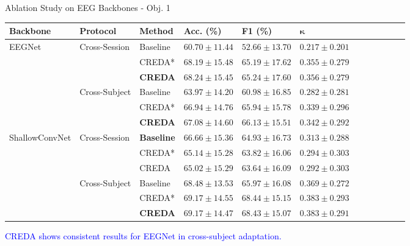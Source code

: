 \documentclass[aspectratio=169]{beamer}
\begin{document}
\begin{frame}{Ablation Study on EEG Backbones - Obj. 1}
\begin{table}
\footnotesize
\centering
\begin{tabularx}{\linewidth}{p{2.4cm}p{1.9cm}p{1.8cm}p{2.4cm}p{2.4cm}p{2.4cm}lllccc}
\toprule
\textbf{Backbone} & \textbf{Protocol} & \textbf{Method} & \textbf{Acc. (\%)} & \textbf{F1 (\%)} & \(\boldsymbol{\kappa}\) \\
\midrule
\multirow{6}{*}{EEGNet}
& \multirow{3}{*}{Cross-Session}
  & Baseline & \(60.70 \pm 11.44\) & \(52.66 \pm 13.70\) & \(0.217 \pm 0.201\) \\
& & CREDA*   & \(68.19 \pm 15.48\) & \(65.19 \pm 17.62\) & \(0.355 \pm 0.279\) \\
& & \textbf{CREDA} & \(\mathbf{68.24 \pm 15.45}\) & \(\mathbf{65.24 \pm 17.60}\) & \(\mathbf{0.356 \pm 0.279}\) \\
\cmidrule(l){2-6}
& \multirow{3}{*}{Cross-Subject}
  & Baseline & \(63.97 \pm 14.20\) & \(60.98 \pm 16.85\) & \(0.282 \pm 0.281\) \\
& & CREDA*   & \(66.94 \pm 14.76\) & \(65.94 \pm 15.78\) & \(0.339 \pm 0.296\) \\
& & \textbf{CREDA} & \(\mathbf{67.08 \pm 14.60}\) & \(\mathbf{66.13 \pm 15.51}\) & \(\mathbf{0.342 \pm 0.292}\) \\
\midrule
\multirow{6}{*}{ShallowConvNet}
& \multirow{3}{*}{Cross-Session}
  & \textbf{Baseline} & \(\mathbf{66.66 \pm 15.36}\) & \(\mathbf{64.93 \pm 16.73}\) & \(\mathbf{0.313 \pm 0.288}\) \\
& & CREDA*   & \(65.14 \pm 15.28\) & \(63.82 \pm 16.06\) & \(0.294 \pm 0.303\) \\
& & CREDA    & \(65.02 \pm 15.29\) & \(63.64 \pm 16.09\) & \(0.292 \pm 0.303\) \\
\cmidrule(l){2-6}
& \multirow{3}{*}{Cross-Subject}
  & Baseline & \(68.48 \pm 13.53\) & \(65.97 \pm 16.08\) & \(0.369 \pm 0.272\) \\
& & CREDA*   & \(69.17 \pm 14.55\) & \(\mathbf{68.44 \pm 15.15}\) & \(0.383 \pm 0.293\) \\
& & \textbf{CREDA} & \(\mathbf{69.17 \pm 14.47}\) & \(68.43 \pm 15.07\) & \(\mathbf{0.383 \pm 0.291}\) \\
\bottomrule
\end{tabularx}
\end{table}


\begin{center}
    \textcolor{blue}{CREDA shows consistent results for EEGNet in cross-subject adaptation.}
\end{center}
\end{frame}
\end{document}

